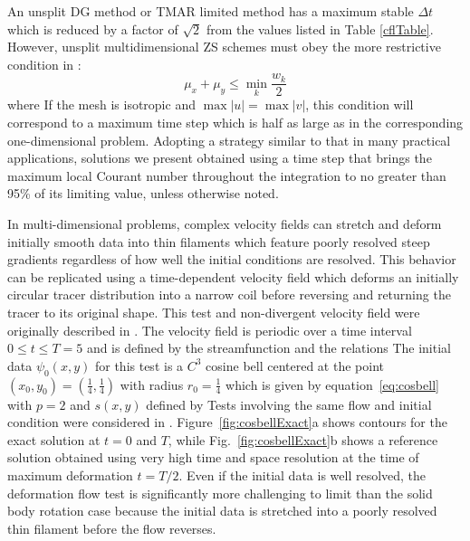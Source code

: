 \documentclass{ametsoc}
\begin{document}
An unsplit DG method or TMAR limited method has a maximum stable $\Delta t$ which is reduced by a factor of $\sqrt{2}$ from the values listed in Table \ref{cflTable}. However, unsplit multidimensional ZS schemes must obey the more restrictive condition in \citep{Zhang2010}: 
\begin{equation}
\mu_x + \mu_y \leq \min \limits_{k} \frac{w_k}{2}
\label{eqn:2dZScfl}
\end{equation}
where 
If the mesh is isotropic and $\max |u| = \max |v|$, this condition will correspond to a maximum time step which is half as large as in the corresponding one-dimensional problem. Adopting a strategy similar to that in many practical applications, solutions we present obtained using a time step that brings the maximum local Courant number throughout the integration to no greater than 95\% of its limiting value, unless otherwise noted.

In multi-dimensional problems, complex velocity fields can stretch and deform initially smooth data into thin filaments which feature poorly resolved steep gradients regardless of how well the initial conditions are resolved. This behavior can be replicated using a time-dependent velocity field which deforms an initially circular tracer distribution into a narrow coil before reversing and returning the tracer to its original shape. This test and non-divergent velocity field were originally described in \citep{LeVeque1996}. The velocity field is periodic over a time interval $0 \leq t \leq T=5$ and is defined by the streamfunction
and the relations
The initial data $\psi_0(x,y)$ for this test is a $C^3$ cosine bell centered at the point $(x_0,y_0) = (\frac{1}{4},\frac{1}{4})$ with radius $r_0 = \frac{1}{4}$ which is given by equation~\eqref{eq:cosbell} with $p=2$ and $s(x,y)$ defined by
%
Tests involving the same flow and initial condition were considered in \citep{ullrich2014}. Figure~\ref{fig:cosbellExact}a shows contours for the exact solution at $t=0$ and $T$, while Fig.~\ref{fig:cosbellExact}b shows a reference solution obtained using very high time and space resolution at the time of maximum deformation $t=T/2$. Even if the initial data is well resolved, the deformation flow test is significantly more challenging to limit than the solid body rotation case because the initial data is stretched into a poorly resolved thin filament before the flow reverses. 
\end{document}
